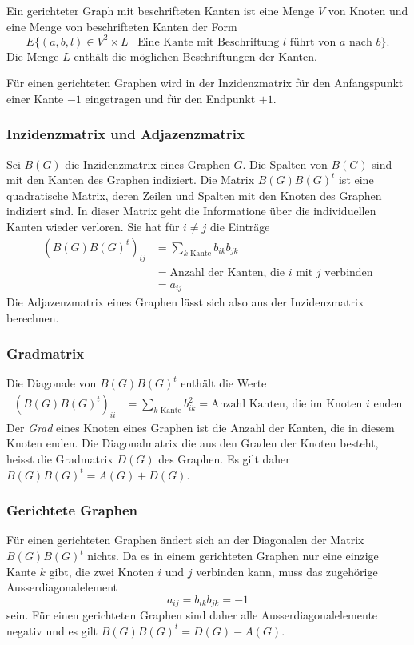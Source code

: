 \begin{definition}
Ein gerichteter Graph mit beschrifteten Kanten ist eine Menge $V$ von 
Knoten und eine Menge von beschrifteten Kanten der Form
\[
E \{ (a,b,l)\in V^2\times L\;|\; \text{Eine Kante mit Beschriftung $l$ führt von $a$ nach $b$}\}.
\]
Die Menge $L$ enthält die möglichen Beschriftungen der Kanten.
\end{definition}

Für einen gerichteten Graphen wird in der Inzidenzmatrix für
den Anfangspunkt einer Kante $-1$ eingetragen und für den
Endpunkt $+1$.

\subsubsection{Inzidenzmatrix und Adjazenzmatrix}
Sei $B(G)$ die Inzidenzmatrix eines Graphen $G$. 
Die Spalten von $B(G)$ sind mit den Kanten des Graphen indiziert.
Die Matrix $B(G)B(G)^t$ ist eine quadratische Matrix, deren
Zeilen und Spalten mit den Knoten des Graphen indiziert sind.
In dieser Matrix geht die Informatione über die individuellen
Kanten wieder verloren.
Sie hat für $i\ne j$ die Einträge
\begin{align*}
(B(G)B(G)^t)_{ij}
&=
\sum_{\text{$k$ Kante}} b_{ik}b_{jk}
\\
&=\text{Anzahl der Kanten, die $i$ mit $j$ verbinden}
\\
&=a_{ij}
\end{align*}
Die Adjazenzmatrix eines Graphen lässt sich also aus der
Inzidenzmatrix berechnen.

\subsubsection{Gradmatrix}
%
Die Diagonale von $B(G)B(G)^t$ enthält die Werte
\begin{align*}
(B(G)B(G)^t)_{ii}
&=
\sum_{\text{$k$ Kante}} b_{ik}^2
=
\text{Anzahl Kanten, die im Knoten $i$ enden}
\end{align*}
Der {\em Grad} eines Knoten eines Graphen ist die Anzahl der
%
Kanten, die in diesem Knoten enden.
Die Diagonalmatrix die aus den Graden der Knoten besteht, heisst die
Gradmatrix $D(G)$ des Graphen.
Es gilt daher $B(G)B(G)^t = A(G) + D(G)$.

\subsubsection{Gerichtete Graphen}
Für einen gerichteten Graphen ändert sich an der Diagonalen
der Matrix $B(G)B(G)^t$ nichts.
Da es in einem gerichteten Graphen nur eine einzige Kante $k$ gibt, die zwei
Knoten $i$ und $j$ verbinden kann, muss das zugehörige 
Ausserdiagonalelement
\[
a_{ij}
=b_{ik}b_{jk}
=
-1
\]
sein.
Für einen gerichteten Graphen sind daher alle Ausserdiagonalelemente
negativ und es gilt $B(G)B(G)^t = D(G)-A(G)$.

